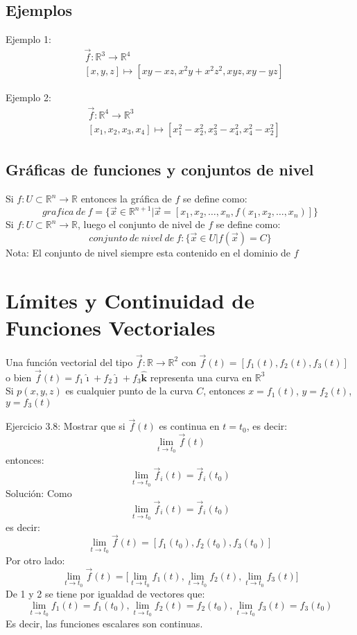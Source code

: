 \documentclass[a4paper]{article}
\newcommand{\ihat}{\boldsymbol{\hat{\imath}}}
\newcommand{\jhat}{\boldsymbol{\hat{\jmath}}}
\newcommand{\khat}{\boldsymbol{\hat{\bm{k}}}}
\begin{document}
\subsection{Ejemplos}
Ejemplo 1:
\[
\begin{split}
&\vec{f}:\mathbb{R}^3\longrightarrow\mathbb{R}^4\\
&[x,y,z]\longmapsto[xy-xz,x^2y+x^2z^2,xyz,xy-yz]
\end{split}
\]

Ejemplo 2:
\[
\begin{split}
&\vec{f}:\mathbb{R}^4\longrightarrow\mathbb{R}^3\\
&[x_1,x_2,x_3,x_4]\longmapsto[x_1^2-x_2^2,x_3^2-x_4^2,x_4^2-x_2^2]
\end{split}
\]
\subsection{Gráficas de funciones y conjuntos de nivel}
Si $f:U\subset\mathbb{R}^n\rightarrow\mathbb{R}$ entonces la gráfica de $f$ se define como:
\[grafica\ de\ f=\{\vec{x}\in\mathbb{R}^{n+1}\big|\vec{x}=[x_1,x_2,\ldots,x_n,f(x_1,x_2,\ldots,x_n)]\}\]
Si $f:U\subset\mathbb{R}^n\longrightarrow\mathbb{R}$, luego el conjunto de nivel de $f$ se define como:
\[conjunto\ de\ nivel\ de\ f:\{\vec{x}\in U\big|f(\vec{x})=C\}\]
{\small Nota: El conjunto de nivel siempre esta contenido en el dominio de $f$}
\section{Límites y Continuidad de Funciones Vectoriales}
Una función vectorial del tipo $\vec{f}:\mathbb{R}\longrightarrow\mathbb{R}^2$ con $\vec{f}(t)=[f_1(t),f_2(t),f_3(t)]$
o bien $\vec{f}(t)=f_1\ihat+f_2\jhat+f_3\khat$ representa una curva en $\mathbb{R}^3$\\
Si $p(x,y,z)$ es cualquier punto de la curva $C$, entonces $x=f_1(t)$, $y=f_2(t)$, $y=f_3(t)$

Ejercicio 3.8: Mostrar que si $\vec{f}(t)$ es continua en $t=t_0$, es decir:
\[\lim_{t\rightarrow t_0} \vec{f}(t)\]
entonces:
\[\lim_{t\rightarrow t_0}\vec{f}_i(t)=\vec{f}_i(t_0)\]
Solución: Como
\[\lim_{t\rightarrow t_0}\vec{f}_i(t)=\vec{f}_i(t_0)\]
es decir:
\begin{equation}\lim_{t\rightarrow t_0} \vec{f}(t)=[f_1(t_0),f_2(t_0),f_3(t_0)] \end{equation}
Por otro lado:
\begin{equation}
\lim_{t\rightarrow t_0} \vec{f}(t)=\Big[\lim_{t\rightarrow t_0} f_1(t),\lim_{t\rightarrow t_0} f_2(t),\lim_{t\rightarrow t_0} f_3(t)\Big]
\end{equation}
De 1 y 2 se tiene por igualdad  de vectores que:
\[\lim_{t\rightarrow t_0} f_1(t)=f_1(t_0),\lim_{t\rightarrow t_0} f_2(t)=f_2(t_0),\lim_{t\rightarrow t_0} f_3(t)=f_3(t_0)\]
Es decir, las funciones escalares son continuas.
\end{document}
